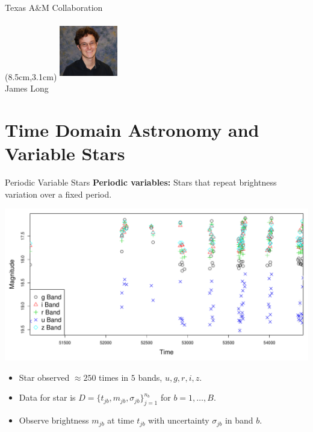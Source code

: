 \documentclass[12pt]{beamer}
\newcommand{\w}{1in}
\newcommand{\h}{1in}
\begin{document}
\begin{frame}{Texas A\&M Collaboration}
  \begin{textblock*}{3cm}(8.5cm,3.1cm) %
\includegraphics[width=\w,height=\h]{figs/long.jpg}\\
James Long
\end{textblock*}


\end{frame}


\section{Time Domain Astronomy and Variable Stars}

\begin{frame}{Periodic Variable Stars}
\textbf{Periodic variables:} Stars that repeat brightness variation over a fixed period.
\begin{center}
\includegraphics[scale=.3]{figs/unfolded_13350.pdf}
\end{center}
\begin{itemize}
\item Star observed $\approx 250$ times in $5$ bands, $u,g,r,i,z$.
\item Data for star is $D=\{t_{jb},m_{jb},\sigma_{jb}\}_{j=1}^{n_b}$ for $b=1,\ldots,B$.
\item Observe brightness $m_{jb}$ at time $t_{jb}$ with uncertainty $\sigma_{jb}$ in band $b$.
\end{itemize}
\end{frame}
\end{document}
